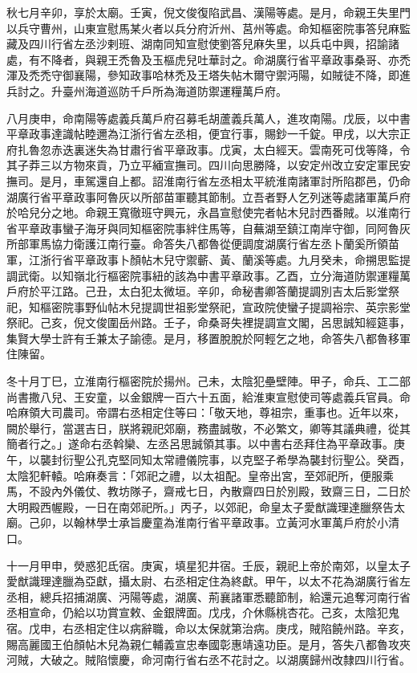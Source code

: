 \begin{pinyinscope}
 秋七月辛卯，享於太廟。壬寅，倪文俊復陷武昌、漢陽等處。是月，命親王失里門以兵守曹州，山東宣慰馬某火者以兵分府沂州、莒州等處。命知樞密院事答兒麻監藏及四川行省左丞沙剌班、湖南同知宣慰使劉答兒麻失里，以兵屯中興，招諭諸處，有不降者，與親王禿魯及玉樞虎兒吐華討之。命湖廣行省平章政事桑哥、亦禿渾及禿禿守御襄陽，參知政事哈林禿及王塔失帖木爾守禦沔陽，如賊徒不降，即進兵討之。升臺州海道巡防千戶所為海道防禦運糧萬戶府。



 八月庚申，命南陽等處義兵萬戶府召募毛胡蘆義兵萬人，進攻南陽。戊辰，以中書平章政事達識帖睦邇為江浙行省左丞相，便宜行事，賜鈔一千錠。甲戌，以大宗正府扎魯忽赤迭裏迷失為甘肅行省平章政事。戊寅，太白經天。雲南死可伐等降，令其子莽三以方物來貢，乃立平緬宣撫司。四川向思勝降，以安定州改立安定軍民安撫司。是月，車駕還自上都。詔淮南行省左丞相太平統淮南諸軍討所陷郡邑，仍命湖廣行省平章政事阿魯灰以所部苗軍聽其節制。立吾者野人乞列迷等處諸軍萬戶府於哈兒分之地。命親王寬徹班守興元，永昌宣慰使完者帖木兒討西番賊。以淮南行省平章政事蠻子海牙與同知樞密院事絆住馬等，自蕪湖至鎮江南岸守御，同阿魯灰所部軍馬協力衛護江南行臺。命答失八都魯從便調度湖廣行省左丞卜蘭奚所領苗軍，江浙行省平章政事卜顏帖木兒守禦蘄、黃、蘭溪等處。九月癸未，命搠思監提調武衛。以知嶺北行樞密院事紐的該為中書平章政事。乙酉，立分海道防禦運糧萬戶府於平江路。己丑，太白犯太微垣。辛卯，命秘書卿答蘭提調別吉太后影堂祭祀，知樞密院事野仙帖木兒提調世祖影堂祭祀，宣政院使蠻子提調裕宗、英宗影堂祭祀。己亥，倪文俊圍岳州路。壬子，命桑哥失裡提調宣文閣，呂思誠知經筵事，集賢大學士許有壬兼太子諭德。是月，移置脫脫於阿輕乞之地，命答失八都魯移軍住陳留。



 冬十月丁巳，立淮南行樞密院於揚州。己未，太陰犯壘壁陣。甲子，命兵、工二部尚書撒八兒、王安童，以金銀牌一百六十五面，給淮東宣慰使司等處義兵官員。命哈麻領大司農司。帝謂右丞相定住等曰：「敬天地，尊祖宗，重事也。近年以來，闕於舉行，當選吉日，朕將親祀郊廟，務盡誠敬，不必繁文，卿等其議典禮，從其簡者行之。」遂命右丞斡欒、左丞呂思誠領其事。以中書右丞拜住為平章政事。庚午，以襲封衍聖公孔克堅同知太常禮儀院事，以克堅子希學為襲封衍聖公。癸酉，太陰犯軒轅。哈麻奏言：「郊祀之禮，以太祖配。皇帝出宮，至郊祀所，便服乘馬，不設內外儀仗、教坊隊子，齋戒七日，內散齋四日於別殿，致齋三日，二日於大明殿西幄殿，一日在南郊祀所。」丙子，以郊祀，命皇太子愛猷識理達臘祭告太廟。己卯，以翰林學士承旨慶童為淮南行省平章政事。立黃河水軍萬戶府於小清口。



 十一月甲申，熒惑犯氐宿。庚寅，填星犯井宿。壬辰，親祀上帝於南郊，以皇太子愛猷識理達臘為亞獻，攝太尉、右丞相定住為終獻。甲午，以太不花為湖廣行省左丞相，總兵招捕湖廣、沔陽等處，湖廣、荊襄諸軍悉聽節制，給還元追奪河南行省丞相宣命，仍給以功賞宣敕、金銀牌面。戊戌，介休縣桃杏花。己亥，太陰犯鬼宿。戊申，右丞相定住以病辭職，命以太保就第治病。庚戌，賊陷饒州路。辛亥，賜高麗國王伯顏帖木兒為親仁輔義宣忠奉國彰惠靖遠功臣。是月，答失八都魯攻夾河賊，大破之。賊陷懷慶，命河南行省右丞不花討之。以湖廣歸州改隸四川行省。




\end{pinyinscope}
